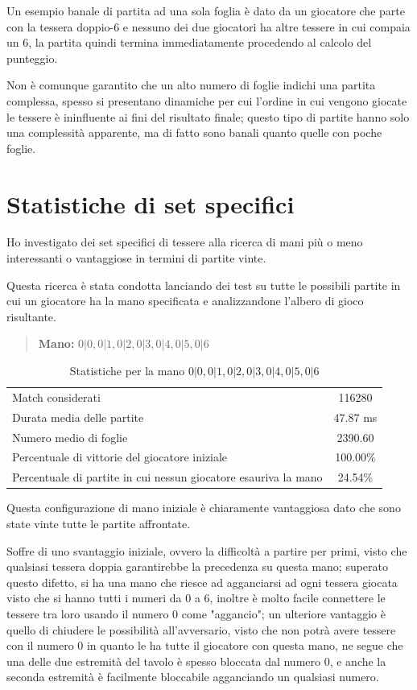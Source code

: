 \documentclass[a4paper,12pt]{report}
\begin{document}
Un esempio banale di partita ad una sola foglia è dato da un giocatore che parte con la tessera doppio-6 e nessuno dei due giocatori ha altre tessere in cui compaia un 6, la partita quindi termina immediatamente procedendo al calcolo del punteggio.


Non è comunque garantito che un alto numero di foglie indichi una partita complessa, spesso si presentano dinamiche per cui l'ordine in cui vengono giocate le tessere è ininfluente ai fini del risultato finale; questo tipo di partite hanno solo una complessità apparente, ma di fatto sono banali quanto quelle con poche foglie.


\section{Statistiche di set specifici}

Ho investigato dei set specifici di tessere alla ricerca di mani più o meno interessanti o vantaggiose in termini di partite vinte.

Questa ricerca è stata condotta lanciando dei test su tutte le possibili partite in cui un giocatore ha la mano specificata e analizzandone l'albero di gioco risultante.

\begin{quote}
    \textbf{Mano:} \(0|0, 0|1, 0|2, 0|3, 0|4, 0|5, 0|6\)
\end{quote}

\begin{table}[h!]
    \centering
    \begin{tabular}{|l|c|}
        \hline
        Match considerati & 116280 \\
        Durata media delle partite & 47.87 ms \\
        Numero medio di foglie & 2390.60 \\
        Percentuale di vittorie del giocatore iniziale & 100.00\% \\
        Percentuale di partite in cui nessun giocatore esauriva la mano & 24.54\% \\
        \hline
    \end{tabular}
    \caption{Statistiche per la mano \(0|0, 0|1, 0|2, 0|3, 0|4, 0|5, 0|6\)}
    \label{tab:stats_5}
\end{table}

Questa configurazione di mano iniziale è chiaramente vantaggiosa dato che sono state vinte tutte le partite affrontate.

Soffre di uno svantaggio iniziale, ovvero la difficoltà a partire per primi, visto che qualsiasi tessera doppia garantirebbe la precedenza su questa mano; superato questo difetto,
si ha una mano che riesce ad agganciarsi ad ogni tessera giocata visto che si hanno tutti i numeri da 0 a 6, inoltre è molto facile connettere le tessere tra loro usando il numero 0 come "aggancio";
un ulteriore vantaggio è quello di chiudere le possibilità all'avversario, visto che non potrà avere tessere con il numero 0 in quanto le ha tutte il giocatore con questa mano, ne segue che una delle 
due estremità del tavolo è spesso bloccata dal numero 0, e anche la seconda estremità è facilmente bloccabile agganciando un qualsiasi numero. 
\end{document}
